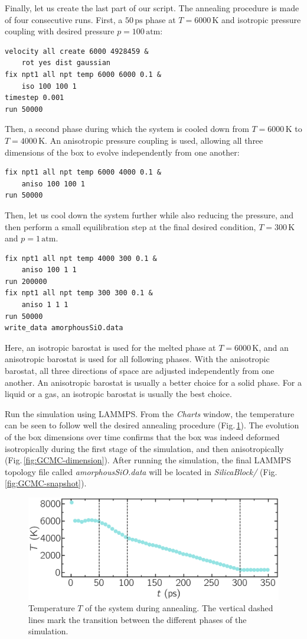 \documentclass[9pt,tutorial]{livecoms}
\begin{document}
Finally, let us create the last part of our script. The annealing procedure is
made of four consecutive runs. First, a $50\,\text{ps}$ phase at $T = 6000\,\text{K}$
and isotropic pressure coupling with desired pressure $p = 100\,\text{atm}$:
\begin{lstlisting}
velocity all create 6000 4928459 &
    rot yes dist gaussian
fix npt1 all npt temp 6000 6000 0.1 &
    iso 100 100 1
timestep 0.001
run 50000
\end{lstlisting}
Then, a second phase during which the system is cooled down from $T = 6000\,\text{K}$
to $T = 4000\,\text{K}$. An anisotropic pressure coupling is used, allowing all
three dimensions of the box to evolve independently from one another:
\begin{lstlisting}
fix npt1 all npt temp 6000 4000 0.1 &
    aniso 100 100 1
run 50000
\end{lstlisting}
Then, let us cool down the system further while also reducing the pressure, and then
perform a small equilibration step at the final desired condition, $T = 300\,\text{K}$ and $p = 1\,\text{atm}$.
\begin{lstlisting}
fix npt1 all npt temp 4000 300 0.1 &
    aniso 100 1 1
run 200000
fix npt1 all npt temp 300 300 0.1 &
    aniso 1 1 1
run 50000
write_data amorphousSiO.data
\end{lstlisting}
Here, an isotropic barostat is used for the melted phase at $T = 6000\,\text{K}$,
and an anisotropic barostat is used for all following phases. With the anisotropic
barostat, all three directions of space are adjusted independently from one another.
An anisotropic barostat is usually a better choice for a solid phase. For a liquid
or a gas, an isotropic barostat is usually the best choice.

Run the simulation using LAMMPS. From the \textit{Charts} window, the temperature
can be seen to follow well the desired annealing procedure (Fig.\,\ref{fig:GCMC-temperature}).
The evolution of the box dimensions over time confirms that the box was indeed
deformed isotropically during the first stage of the simulation, and then anisotropically
(Fig.\,\ref{fig:GCMC-dimension}). After running
the simulation, the final LAMMPS topology file called \textit{amorphousSiO.data}
will be located in \textit{SilicaBlock/} (Fig.\,\ref{fig:GCMC-snapshot}).

\begin{figure}
\centering
\includegraphics[width=\linewidth]{GCMC-temperature}
\caption{Temperature $T$ of the system during annealing. The vertical dashed lines
mark the transition between the different phases of the simulation.}
\label{fig:GCMC-temperature}
\end{figure}
\end{document}
